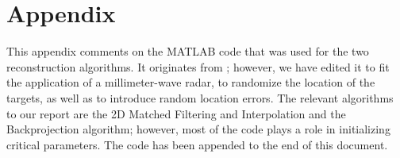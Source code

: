 \documentclass{article}
\begin{document}
\section{Appendix}
\indent \indent
This appendix comments on the MATLAB code that was used for the two reconstruction algorithms. It originates from \cite{SARbook}; however, we have edited it to fit the application of a millimeter-wave radar, to randomize the location of the targets, as well as to introduce random location errors. The relevant algorithms to our report are the 2D Matched Filtering and Interpolation and the Backprojection algorithm; however, most of the code plays a role in initializing critical parameters. The code has been appended to the end of this document.

\nocite{*}


\end{document}
